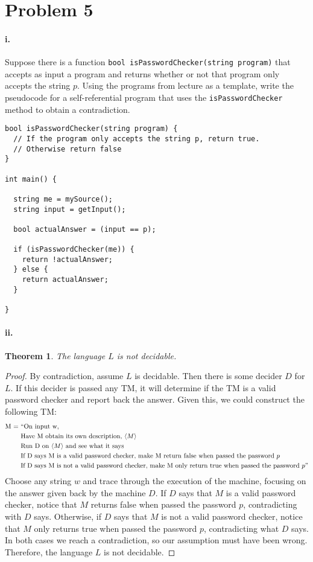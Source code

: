 \documentclass[10pt,letter]{article}
\newtheorem*{thm}{Theorem}
\begin{document}
\section*{Problem 5}

\paragraph{i.} Suppose there is a function \texttt{bool isPasswordChecker(string program)} that accepts as input a program and returns whether or not that program only accepts the string $p$. Using the programs from lecture as a template, write the pseudocode for a self-referential program that uses the \texttt{isPasswordChecker} method to obtain a contradiction. 
{\selectfont
\begin{lstlisting}
bool isPasswordChecker(string program) {
  // If the program only accepts the string p, return true.
  // Otherwise return false
}

int main() {

  string me = mySource();
  string input = getInput();

  bool actualAnswer = (input == p);

  if (isPasswordChecker(me)) {
    return !actualAnswer;
  } else {
    return actualAnswer;
  }

}
\end{lstlisting}

\paragraph{ii.} 
\begin{thm} The language $L$ is not decidable. \end{thm}
\begin{proof} By contradiction, assume $L$ is decidable. Then there is some decider $D$ for $L$. If this decider is passed any TM, it will determine if the TM is a valid password checker and report back the answer. Given this, we could construct the following TM:
\begin{align*}
\text{M = }&\text{``On input w,}\\
&\text{Have M obtain its own description, }\langle M \rangle\\
&\text{Run D on }\langle M \rangle \text{ and see what it says}\\
&\text{If D says M is a valid password checker, make M return false when passed the password } p\\
&\text{If D says M is not a valid password checker, make M only return true when passed the password } p"
\end{align*}
Choose any string $w$ and trace through the execution of the machine, focusing on the answer given back by the machine $D$. If $D$ says that $M$ is a valid password checker, notice that $M$ returns false when passed the password $p$, contradicting with $D$ says. Otherwise, if $D$ says that $M$ is not a valid password checker, notice that $M$ only returns true when passed the password $p$, contradicting what $D$ says. In both cases we reach a contradiction, so our assumption must have been wrong. Therefore, the language $L$ is not decidable.
\end{proof}

}
\end{document}

